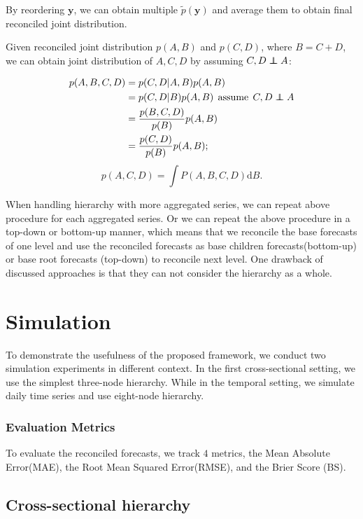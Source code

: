 \documentclass[a4paper,review,12pt,authoryear]{elsarticle}
\newcommand\independent{\protect\mathpalette{\protect\independenT}{\perp}}
\def\independenT#1#2{\mathrel{\rlap{$#1#2$}\mkern2mu{#1#2}}}
\begin{document}
   By reordering $\bm{y}$, we can obtain multiple $\tilde p(\bm{y})$ and average them to obtain final reconciled joint distribution.

  Given reconciled joint distribution $p(A, B)$ and $p(C,D)$, where $B=C+D$, we can obtain joint distribution of $A,C,D$ by assuming $C,D \independent{A}$:

  \[
      \begin{aligned}
        p(A,B,C,D) &= p(C, D|A,B)p(A,B) \\ 
          &= p(C,D|B)p(A,B)  \:\: \textrm{assume}\:\: C,D \independent {A}\\
          &= \frac{p(B,C,D)}{p(B)}p(A,B) \\
          &= \frac{p(C,D)}{p(B)}p(A,B);
     \end{aligned}
     \]
     \[
       p(A,C,D) = \int P(A,B,C,D) \textrm{d}B.
      \]


   When handling hierarchy with more aggregated series, we can repeat above procedure for each aggregated series. 
   Or we can repeat the above procedure in a top-down or bottom-up manner, which means that we reconcile the base forecasts of one level and use the reconciled forecasts as base children forecasts(bottom-up) or base root forecasts (top-down) to reconcile next level. One drawback of discussed approaches is that they can not consider the hierarchy as a whole.


\section{Simulation}

To demonstrate the usefulness of the proposed framework, we conduct two simulation experiments in different context. 
In the first cross-sectional setting, we use the simplest three-node hierarchy. 
While in the temporal setting, we simulate daily time series and use eight-node hierarchy.

\subsubsection*{Evaluation Metrics}

To evaluate the reconciled forecasts, we track $4$ metrics, the Mean Absolute Error(MAE), the Root Mean Squared Error(RMSE), and the Brier Score (BS). 


\subsection{Cross-sectional hierarchy}
\end{document}
